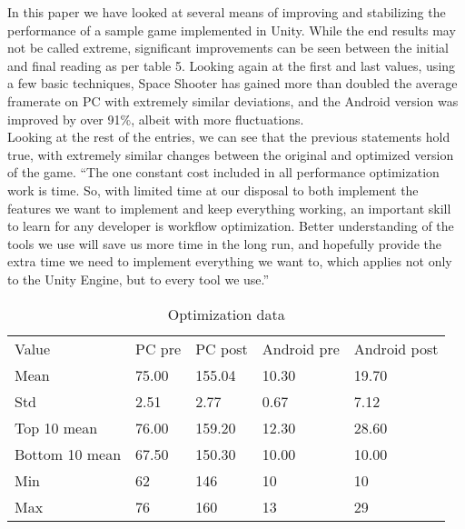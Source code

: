 In this paper we have looked at several means of improving and stabilizing the performance of a sample game implemented in Unity. While the end results may not be called extreme, significant improvements can be seen between the initial and final reading as per table 5. Looking again at the first and last values, using a few basic techniques, Space Shooter has gained more than doubled the average framerate on PC with extremely similar deviations, and the Android version was improved by over 91\%, albeit with more fluctuations. \\
Looking at the rest of the entries, we can see that the previous statements hold true, with extremely similar changes between the original and optimized version of the game.
``The one constant cost included in all performance optimization work is time. So, with
limited time at our disposal to both implement the features we want to implement and keep
everything working, an important skill to learn for any developer is workflow optimization.
Better understanding of the tools we use will save us more time in the long run, and
hopefully provide the extra time we need to implement everything we want to, which
applies not only to the Unity Engine, but to every tool we use.''\cite{optimizationbook}
\begin{table}
\caption{Optimization data}
\label{tab:conf}
\begin{minipage}{0.49\textwidth}
\begin{center}
\begin{tabular}{lllll}
Value & PC pre & PC post & Android pre & Android post \\
Mean & 75.00 & 155.04 & 10.30 & 19.70 \\
Std & 2.51 & 2.77 & 0.67 & 7.12 \\
Top 10 mean & 76.00 & 159.20 & 12.30 & 28.60 \\
Bottom 10 mean & 67.50 & 150.30 & 10.00 & 10.00 \\
Min & 62 & 146 & 10 & 10 \\
Max & 76 & 160 & 13 & 29 
\end{tabular}
\bigskip
\end{center} 
\end{minipage}
\end{table}